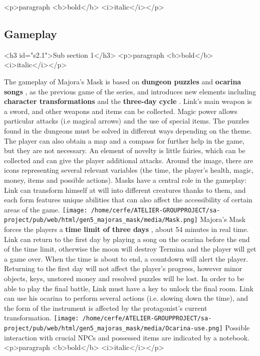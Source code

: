 \documentclass[a4paper,10pt]{book}
\begin{document}
 <p>paragraph <b>bold</b> <i>italic</i></p> 
 \subsection{Gameplay }
 <h3 id="s2.1">Sub section 1</h3>
        <p>paragraph <b>bold</b> <i>italic</i></p> 
 
          The gameplay of Majora's Mask is based on  \textbf{dungeon puzzles }  and  \textbf{ocarina songs } , as the previous game of the series, and introduces new elements including
           \textbf{character transformations }  and  the  \textbf{three-day cycle } .
          Link's main weapon is a sword, and other weapons and items can be collected. Magic power allows particular attacks (i.e magical arrows) and the use of special items.
          The puzzles found in the dungeons must be solved in different ways depending on the theme. 
          The player can also obtain a map and a compass for further help in the game, but they are not necessary. 
          An element of novelty is little fairies, which can be collected and can give the player
          additional attacks. 
          Around the image, there are icons representing several relevant variables (the time, the player's health, magic, money, items and possible actions). 
          Masks have a central role in the gameplay: Link can transform himself at will into different creatures thanks to them, and each form features unique abilities that can also affect the accessibility
          of certain areas of the game. 
 \texttt{[image: /home/cerfe/ATELIER-GROUPPROJECT/sa-project/pub/web/html/gen5\_majoras\_mask/media/Mask.png]}
          Majora's Mask forces the players a  \textbf{time limit of three days } , about 54 minutes in real time. Link can return to the first day by playing a song on the ocarina
          before the end of the time limit, otherwise the moon will destroy Termina and the player will get a game over. When the time is about to end, a countdown will alert the player. Returning to the first day
          will not affect the player's progress, however minor objects, keys, unstored money and resolved puzzles will be lost. In order to be able to play the final battle, Link must have a key to unlock the final room.
          Link can use his ocarina to perform several actions (i.e. slowing down the time), and the form of the instrument is affected by the protagonist's current transformation. 
 \texttt{[image: /home/cerfe/ATELIER-GROUPPROJECT/sa-project/pub/web/html/gen5\_majoras\_mask/media/Ocarina-use.png]}
          Possible interaction with crucial NPCs and possessed items are indicated by a notebook.
         <p>paragraph <b>bold</b> <i>italic</i></p> 
\end{document}
